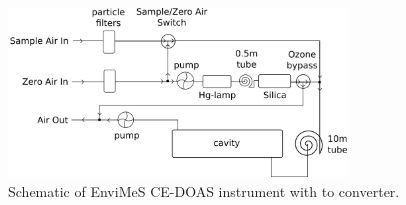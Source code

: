 \begin{figure}[htbp]
  \centering
  \includegraphics[width=0.8\textwidth]{images/envimes_setup.png}
  \caption{Schematic of EnviMeS CE-DOAS instrument with  to
     converter.}
  \label{fig:envimes-schematic}
\end{figure}


